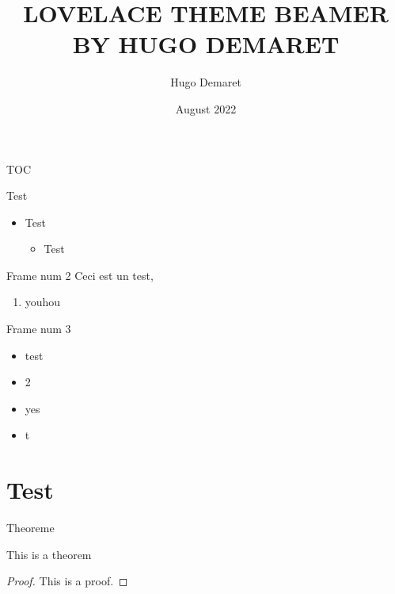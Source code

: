 \documentclass[]{beamer}
\title{LOVELACE THEME BEAMER BY HUGO DEMARET}
\author{Hugo Demaret}
\date{August 2022}
\begin{document}
\maketitle

\begin{frame}{TOC}
    \tableofcontents
\end{frame}

\begin{frame}{Test}
\begin{itemize}
    \item Test
    \begin{itemize}
        \item Test
    \end{itemize}
\end{itemize}
\end{frame}
\begin{frame}{Frame num 2}
    Ceci est un test,
    \begin{enumerate}
        \item youhou
    \end{enumerate}
\end{frame}

\begin{frame}{Frame num 3}

\begin{itemize}
    \item <1-> test
    \item <2> 2
    \item <2-> yes
    \item <3> t
\end{itemize}
    
\end{frame}

\section{Test}
\begin{frame}{Theoreme}
    \begin{theorem}
    This is a theorem
    \end{theorem}
    \begin{proof}
        This is a proof.
    \end{proof}
\end{frame}
\end{document}
